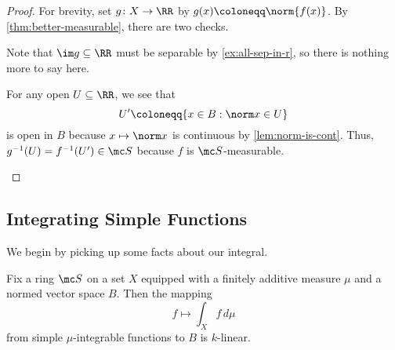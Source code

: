 \documentclass[../notes.tex]{subfiles}
\begin{document}
\begin{proof}
	For brevity, set $g\colon X\to\RR$ by $g(x)\coloneqq\norm{f(x)}$. By \autoref{thm:better-measurable}, there are two checks.
	\begin{listroman}
		\item Note that $\im g\subseteq\RR$ must be separable by \autoref{ex:all-sep-in-r}, so there is nothing more to say here.
		\item For any open $U\subseteq\RR$, we see that
		\[U'\coloneqq\{x\in B:\norm x\in U\}\]
		is open in $B$ because $x\mapsto\norm x$ is continuous by \autoref{lem:norm-is-cont}. Thus, $g^{-1}(U)=f^{-1}(U')\in\mc S$ because $f$ is $\mc S$-measurable.
		\qedhere
	\end{listroman}
\end{proof}

\subsection{Integrating Simple Functions}
We begin by picking up some facts about our integral.
\begin{lemma} \label{lem:int-is-linear}
	Fix a ring $\mc S$ on a set $X$ equipped with a finitely additive measure $\mu$ and a normed vector space $B$. Then the mapping
	\[f\mapsto\int_Xf\,d\mu\]
	from simple $\mu$-integrable functions to $B$ is $k$-linear.
\end{lemma}
\end{document}
